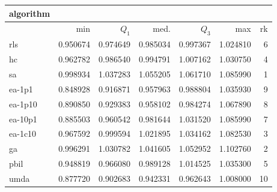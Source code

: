\begin{tabular}{@{}l*{5}{>{{}}N{1}{2}}>{{}}N{2}{0}@{}}
\toprule
{algorithm} &  \\
\midrule
& {min} & {$Q_1$} & {med.} & {$Q_3$} & {max} & {rk}\\
\midrule
rls & 0.950674 & 0.974649 & 0.985034 & 0.997367 & 1.024810 & 6\\
hc & 0.962782 & 0.986540 & 0.994791 & 1.007162 & 1.030750 & 4\\
sa & {\color{blue}} 0.998934 & {\color{blue}} 1.037283 & {\color{blue}} 1.055205 & {\color{blue}} 1.061710 & 1.085990 & 1\\
ea-1p1 & 0.848928 & 0.916871 & 0.957963 & 0.988804 & 1.035930 & 9\\
ea-1p10 & 0.890850 & 0.929383 & 0.958102 & 0.984274 & 1.067890 & 8\\
ea-10p1 & 0.885503 & 0.960542 & 0.981644 & 1.031520 & 1.085990 & 7\\
ea-1c10 & 0.967592 & 0.999594 & 1.021895 & 1.034162 & 1.082530 & 3\\
ga & 0.996291 & 1.030782 & 1.041605 & 1.052952 & {\color{blue}} 1.102760 & 2\\
pbil & 0.948819 & 0.966080 & 0.989128 & 1.014525 & 1.035300 & 5\\
umda & 0.877720 & 0.902683 & 0.942331 & 0.962643 & 1.008000 & 10\\
\bottomrule
\end{tabular}
